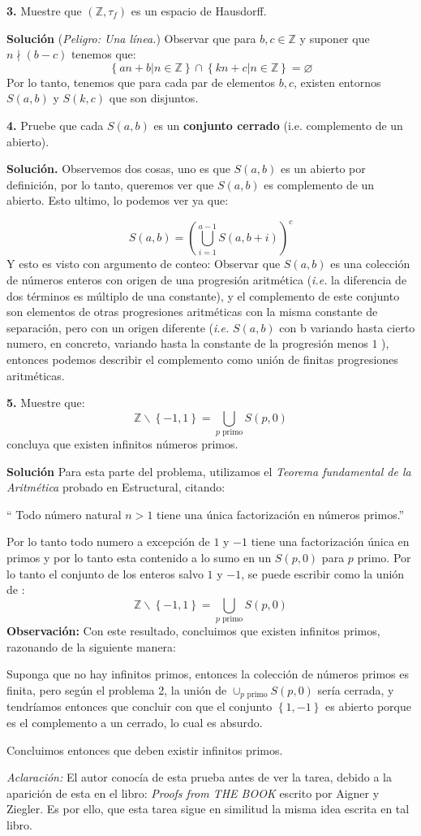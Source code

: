\documentclass[notitlepage]{report}
\newcommand{\lrp}[1]{\left( #1 \right)}
\newcommand{\set}[1]{\left\lbrace #1 \right\rbrace}
\newcommand{\ZZ}{\mathbb{Z}}
\newcommand{\qt}[1]{\textrm{#1}}
\newcommand{\ndivs}{\nmid}
\begin{document}
\textbf{3.} Muestre que $(\ZZ, \tau_f) $ es un espacio de Hausdorff.

\textbf{Solución} (\emph{Peligro: Una línea.}) Observar que para $b,c \in \ZZ$ y suponer que $n \ndivs (b-c) $ tenemos que:
\[ \set{an + b| n \in \ZZ } \cap \set{kn +c | n \in \ZZ} = \varnothing  \]
Por lo tanto, tenemos que para cada par de elementos $b,c$, existen entornos $ S(a,b) $ y $ S(k, c) $ que son disjuntos.

\textbf{4.} Pruebe que cada $ S(a,b) $ es un \textbf{conjunto cerrado} (i.e. complemento de un abierto).

\textbf{Solución.}
Observemos dos cosas, uno es que $S(a,b)$ es un abierto por definición, por lo tanto, queremos ver que $S(a,b)$ es complemento de un abierto. Esto ultimo, lo podemos ver ya que:

\[ S(a,b)  = \lrp{\bigcup_{i= 1}^{a-1} S(a ,b + i)}^c \]
Y esto es visto con argumento de conteo: 
Observar que $S(a,b)$ es una colección de números enteros con origen de una progresión aritmética (\emph{i.e.} la diferencia de dos términos es múltiplo de una constante), y el complemento de este conjunto son elementos de otras progresiones aritméticas con la misma constante de separación, pero con un origen diferente (\emph{i.e.} $ S(a,b) $ con b variando hasta cierto numero, en concreto, variando hasta la constante de la progresión menos $1$ ), entonces podemos describir el complemento como unión de finitas progresiones aritméticas.

\textbf{5.} Muestre que:
\[ \ZZ \backslash \set{-1,1} = \bigcup_{p \qt{ primo}} S(p,0) \]
concluya que existen infinitos números primos.

\textbf{Solución}
Para esta parte del problema, utilizamos el \emph{Teorema fundamental de la Aritmética} probado en Estructural, citando:

\begin{center}
`` Todo número natural $n > 1$ tiene una única factorización en números primos.''
\end{center}

Por lo tanto todo numero a excepción de $1$ y $-1$ tiene una factorización única en primos y por lo tanto esta contenido a lo sumo en un $S(p,0)$  para $p$ primo. Por lo tanto el conjunto de los enteros salvo $1$ y $-1$, se puede escribir como la unión de :
\[ \ZZ \backslash \set{-1,1} = \bigcup_{p \qt{ primo}} S(p,0) \]
 \textbf{Observación:} Con este resultado, concluimos que existen infinitos primos, razonando de la siguiente manera:
 
 Suponga que no hay infinitos primos, entonces la colección de números primos es finita, pero según el problema 2, la unión de $ \cup_{p \qt{ primo}} S(p,0)  $ sería cerrada, y tendríamos entonces que concluir con que el conjunto $ \set{1,-1} $ es abierto porque es el complemento a un cerrado, lo cual es absurdo.
 
 Concluimos entonces que deben existir infinitos primos.
 
 \emph{Aclaración: } El autor conocía de esta prueba antes de ver la tarea, debido a la aparición de esta en el libro: \emph{Proofs from THE BOOK} escrito por Aigner y Ziegler. Es por ello, que esta tarea sigue en similitud la misma idea escrita en tal libro. 
\end{document}
